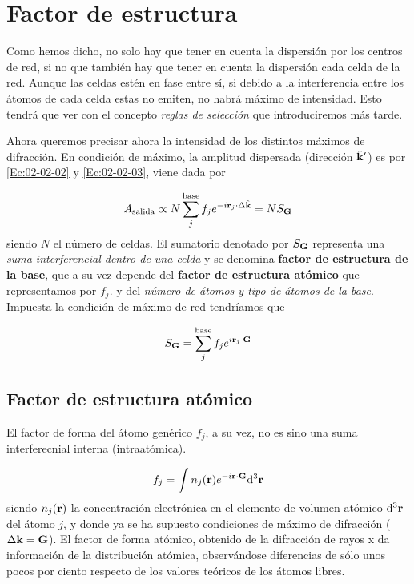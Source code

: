 \section{Factor de estructura} \label{Sec:02-03}

Como hemos dicho, no solo hay que tener en cuenta la dispersión por los centros de red, si no que también hay que tener en cuenta la dispersión cada celda de la red. Aunque las celdas estén en fase entre sí, si debido a la interferencia entre los átomos de cada celda estas no emiten, no habrá máximo de intensidad. Esto tendrá que ver con el concepto \textit{reglas de selección} que introduciremos más tarde. 

Ahora queremos precisar ahora la intensidad de los distintos máximos de difracción. En condición de máximo, la amplitud dispersada (dirección $\hat{\mathbf{k}}'$) es por \ref{Ec:02-02-02} y \ref{Ec:02-02-03}, viene dada por 

\begin{equation}
    A_{\text{salida}} \propto N \sum_j^{\text{base}} f_j e^{-i\mathbf{r}_j \cdot \Delta \hat{\mathbf{k}}} = N S_{\mathbf{G}} \label{Ec:02-03-01}
\end{equation}
siendo $N$ el número de celdas. El sumatorio denotado por $S_{\mathbf{G}}$ representa una \textit{suma interferencial dentro de una celda} y se denomina \textbf{factor de estructura de la base}, que a su vez depende del \textbf{factor de estructura atómico} que representamos por $f_j$. y del \textit{número de átomos y tipo de átomos de la base}. Impuesta la condición de máximo de red tendríamos que

\begin{equation}
	S_{\mathbf{G}} = \sum_{j}^{\text{base}} f_j e^{i \mathbf{r}_j \cdot \mathbf{G}} \label{Ec:02-03-02}
\end{equation}

\subsection{Factor de estructura atómico}

El factor de forma del átomo genérico $f_j$, a su vez, no es sino una suma interferecnial interna (intraatómica). 

\begin{equation}
	f_j = \int n_j (\mathbf{r}) e^{-i \mathbf{r} \cdot \mathbf{G}} \mathrm{d}^3 \mathbf{r}
\end{equation}
siendo $n_j (\mathbf{r})$ la concentración electrónica en el elemento de volumen atómico $\mathrm{d}^3 \mathbf{r}$ del átomo $j$, y donde ya se ha supuesto condiciones de máximo de difracción ($\Delta \mathbf{k}  = \mathbf{G}$). El factor de forma atómico, obtenido de la difracción de rayos x da información de la distribución atómica, observándose diferencias de sólo unos pocos por ciento respecto de los valores teóricos de los átomos libres. 
 

